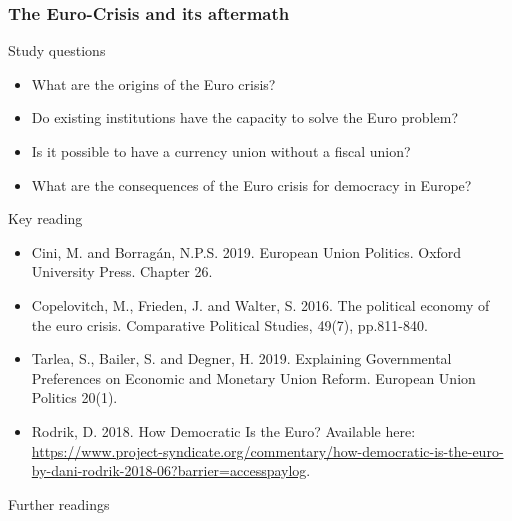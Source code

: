 \subsubsection*{The Euro-Crisis and its aftermath}

Study questions

\begin{itemize}
	\item What are the origins of the Euro crisis?
	\item Do existing institutions have the capacity to solve the Euro problem?
	\item Is it possible to have a currency union without a fiscal union?
	\item What are the consequences of the Euro crisis for democracy in Europe?
\end{itemize}

\noindent Key reading

\begin{itemize}
	\item Cini, M. and Borragán, N.P.S. 2019. European Union Politics. Oxford University Press. Chapter 26.
	\item Copelovitch, M., Frieden, J. and Walter, S. 2016. The political economy of the euro crisis. Comparative Political Studies, 49(7), pp.811-840.
	\item Tarlea, S., Bailer, S. and Degner, H. 2019. Explaining Governmental Preferences on Economic and Monetary Union Reform. European Union Politics 20(1).
	\item Rodrik, D. 2018. How Democratic Is the Euro? Available here: \url{https://www.project-syndicate.org/commentary/how-democratic-is-the-euro-by-dani-rodrik-2018-06?barrier=accesspaylog}.
\end{itemize}

\noindent Further readings

